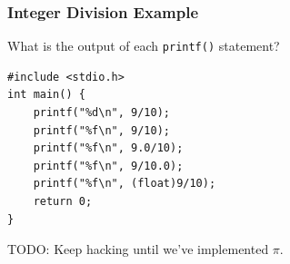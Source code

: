 \documentclass[14pt]{beamer}
\begin{document}
\begin{frame}[fragile]
\frametitle{Integer Division Example}
What is the output of each \texttt{printf()} statement?
\begin{lstlisting}[style=CStyle]
#include <stdio.h>
int main() {
	printf("%d\n", 9/10);
	printf("%f\n", 9/10);
	printf("%f\n", 9.0/10);
	printf("%f\n", 9/10.0);
	printf("%f\n", (float)9/10);
	return 0;
}
\end{lstlisting}
\end{frame}

\begin{frame}
TODO: Keep hacking until we've implemented $\pi$.
\end{frame}
\end{document}
